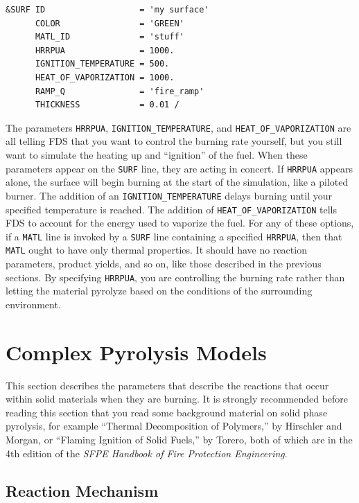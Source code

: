 \documentclass[11pt]{book}
\newcommand{\ct}{\tt\small}
\begin{document}
\footnotesize
\begin{verbatim}
&SURF ID                   = 'my surface'
      COLOR                = 'GREEN'
      MATL_ID              = 'stuff'
      HRRPUA               = 1000.
      IGNITION_TEMPERATURE = 500.
      HEAT_OF_VAPORIZATION = 1000.
      RAMP_Q               = 'fire_ramp'
      THICKNESS            = 0.01 /
\end{verbatim} \normalsize

\noindent
The parameters {\ct HRRPUA}, {\ct IGNITION\_TEMPERATURE}, and {\ct HEAT\_OF\_VAPORIZATION} are all telling FDS that you want to control the
burning rate yourself, but you still want to simulate the heating up and ``ignition'' of the fuel. When these parameters appear on the {\ct SURF} line, they
are acting in concert. If {\ct HRRPUA} appears alone, the surface will begin burning at the start of the simulation, like a piloted burner. The addition of
an {\ct IGNITION\_TEMPERATURE} delays burning until your specified temperature is reached. The addition of {\ct HEAT\_OF\_VAPORIZATION}
tells FDS to account for the energy used to vaporize the fuel. For any of these options, if a {\ct MATL} line is invoked by a {\ct SURF} line containing
a specified {\ct HRRPUA}, then that {\ct MATL} ought to have only thermal properties. It should have no reaction parameters, product yields, and so on, like
those described in the previous sections. By specifying {\ct HRRPUA}, you are controlling the burning rate rather than letting the material pyrolyze based on
the conditions of the surrounding environment.




\clearpage

\section{Complex Pyrolysis Models}
\label{info:solid_pyrolysis}

This section describes the parameters that describe the reactions that occur within solid
materials when they are burning. It is strongly recommended before reading this section that you read some background material on
solid phase pyrolysis, for example ``Thermal Decomposition of Polymers,'' by Hirschler and Morgan, or
``Flaming Ignition of Solid Fuels,'' by Torero, both of which are in the 4th edition of the
{\em SFPE Handbook of Fire Protection Engineering}.

\subsection{Reaction Mechanism}
\end{document}
